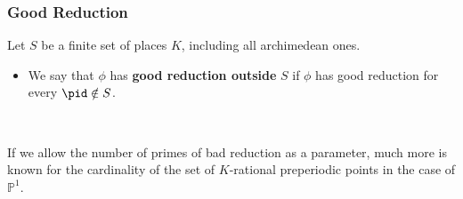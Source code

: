 \documentclass{beamer}
\def\jump{ \quad \\ \vspace{0.7cm} \pause}
\def\PP{{\mathbb P}}
\theoremstyle{thmstyle}
\theoremstyle{thmstyle}
\theoremstyle{mystyle}
\theoremstyle{qstnstyle}
\begin{document}
%
%
%
%
%

\begin{frame}
\frametitle{Good Reduction}
Let $S$ be a finite set of places $K$, including all archimedean ones.
\jump
\begin{itemize}
\item We say that $\phi$  has \textbf{good reduction outside} $S$ if $\phi$ has good reduction for every $\pid \notin S$.

\jump
\end{itemize}

If we allow the number of primes of bad reduction as a parameter, much more is known for the cardinality of the set of $K$-rational preperiodic points in the case of $\PP^1$. 
\end{frame}
\end{document}
